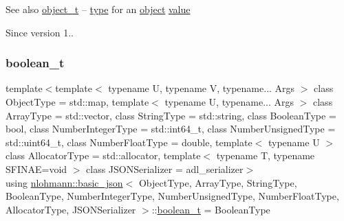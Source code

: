 \begin{DoxySeeAlso}{See also}
\mbox{\hyperlink{classnlohmann_1_1basic__json_aa1eb13d5aa86f80cbee6c58e90fbaf49}{object\+\_\+t}} -- \mbox{\hyperlink{classnlohmann_1_1basic__json_a2b2d781d7f2a4ee41bc0016e931cadf7}{type}} for an \mbox{\hyperlink{classnlohmann_1_1basic__json_a9f42ee7d10eee2d5a73fd94ca7f767ca}{object}} \mbox{\hyperlink{classnlohmann_1_1basic__json_af9c51328fbe1da75eca750be3009917a}{value}}
\end{DoxySeeAlso}
\begin{DoxySince}{Since}
version 1.. 
\end{DoxySince}
\mbox{\label{classnlohmann_1_1basic__json_a4c919102a9b4fe0d588af64801436082}} 
\subsubsection{\texorpdfstring{boolean\_t}{boolean\_t}}
{\footnotesize\ttfamily template$<$template$<$ typename U, typename V, typename... Args $>$ class Object\+Type = std\+::map, template$<$ typename U, typename... Args $>$ class Array\+Type = std\+::vector, class String\+Type  = std\+::string, class Boolean\+Type  = bool, class Number\+Integer\+Type  = std\+::int64\+\_\+t, class Number\+Unsigned\+Type  = std\+::uint64\+\_\+t, class Number\+Float\+Type  = double, template$<$ typename U $>$ class Allocator\+Type = std\+::allocator, template$<$ typename T, typename S\+F\+I\+N\+A\+E=void $>$ class J\+S\+O\+N\+Serializer = adl\+\_\+serializer$>$ \\
using \mbox{\hyperlink{classnlohmann_1_1basic__json}{nlohmann\+::basic\+\_\+json}}$<$ Object\+Type, Array\+Type, String\+Type, Boolean\+Type, Number\+Integer\+Type, Number\+Unsigned\+Type, Number\+Float\+Type, Allocator\+Type, J\+S\+O\+N\+Serializer $>$\+::\mbox{\hyperlink{classnlohmann_1_1basic__json_a4c919102a9b4fe0d588af64801436082}{boolean\+\_\+t}} =  Boolean\+Type}



